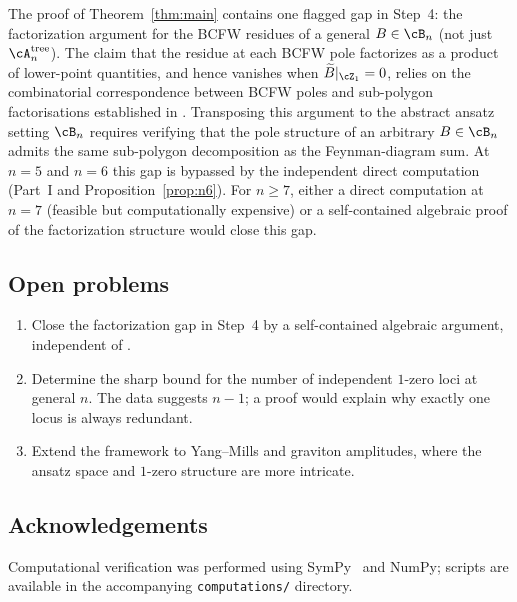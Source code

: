 The proof of Theorem~\ref{thm:main} contains one flagged gap
in Step~4: the factorization argument for the BCFW residues
of a general $B \in \cB_n$ (not just $\cA_n^{\mathrm{tree}}$).
The claim that the residue at each BCFW pole factorizes as a
product of lower-point quantities, and hence vanishes when
$\widetilde{B}|_{\cZ_1} = 0$, relies on the combinatorial
correspondence between BCFW poles and sub-polygon factorisations
established in \cite[Sec.~3]{Rodina2024}. Transposing this
argument to the abstract ansatz setting $\cB_n$ requires
verifying that the pole structure of an arbitrary $B \in \cB_n$
admits the same sub-polygon decomposition as the Feynman-diagram
sum. At $n = 5$ and $n = 6$ this gap is bypassed by the
independent direct computation (Part~I and
Proposition~\ref{prop:n6}). For $n \geq 7$, either a direct
computation at $n = 7$ (feasible but computationally expensive)
or a self-contained algebraic proof of the factorization
structure would close this gap.

\subsection*{Open problems}

\begin{enumerate}[label=(\roman*)]
  \item Close the factorization gap in Step~4 by a
    self-contained algebraic argument, independent of
    \cite{Rodina2024}.

  \item Determine the sharp bound for the number of
    independent $1$-zero loci at general $n$.
    The data suggests $n - 1$; a proof would explain
    why exactly one locus is always redundant.

  \item Extend the framework to Yang--Mills and graviton
    amplitudes, where the ansatz space and $1$-zero
    structure are more intricate.
\end{enumerate}

\subsection*{Acknowledgements}

Computational verification was performed using
SymPy~\cite{SymPy2017} and NumPy; scripts are available in the
accompanying \texttt{computations/} directory.

\bigskip


